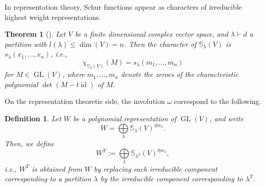 \documentclass[a4paper]{amsart}
\newtheorem{theorem}{Theorem}
\newtheorem{definition}{Definition}
\DeclareMathOperator{\GL}{\mathrm{GL}}
\DeclareMathOperator{\id}{\mathrm{id}}
\begin{document}
In representation theory, Schur functions appear as characters of irreducible highest weight representations.
\begin{theorem}[{\cite[Thm. A2.4]{Sta99}}]\label{symf:thm2}
	Let $V$ be a finite dimensional complex vector space,
	and $\lambda\vdash d$ a partition with $l(\lambda)\leq \dim(V)=n$.
	Then the character of $\mathbb{S}_\lambda(V)$ is $s_\lambda(x_1,\ldots,x_n)$, i.e.,
	\begin{displaymath}
		\chi_{\mathbb{S}_\lambda(V)}(M)=s_\lambda(m_1,\ldots,m_n)
	\end{displaymath}
	for $M\in\GL(V)$, where $m_1,\ldots,m_n$ denote the zeroes of the characteristic polynomial $\det(M-t\id)$ of $M$.
\end{theorem}
On the representation theoretic side, the involution $\omega$ correspond to the following.
\begin{definition}
	Let $W$ be a polynomial representation of $\GL(V)$,
	and write
	\begin{displaymath}
		W=\bigoplus\limits_{\lambda}\mathbb{S}_\lambda(V)^{\oplus a_\lambda}.
	\end{displaymath}
	 Then, we define
	 \begin{displaymath}
	 	W^T:=\bigoplus\limits_{\lambda}\mathbb{S}_{\lambda^T}(V)^{\oplus a_\lambda},
	 \end{displaymath}
	 i.e., $W^T$ is obtained from $W$ by replacing each irreducible component corresponding to a partition $\lambda$ by the irreducible component corresponding to $\lambda^T$.
\end{definition}
\end{document}
